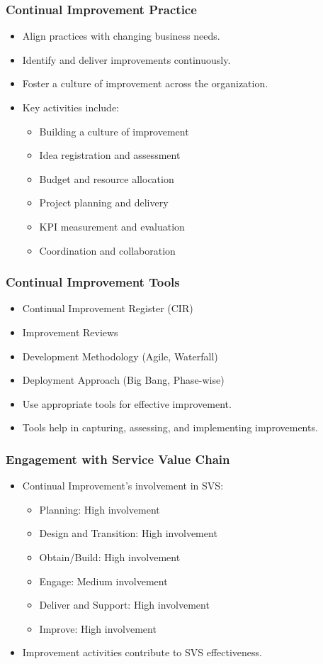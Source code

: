 \documentclass[aspectratio=169, table]{beamer}
\begin{document}
	\begin{frame}
		\frametitle{Continual Improvement Practice}
		\begin{itemize}
			\item Align practices with changing business needs.
			\item Identify and deliver improvements continuously.
			\item Foster a culture of improvement across the organization.
			\item Key activities include:
			\begin{itemize}
				\item Building a culture of improvement
				\item Idea registration and assessment
				\item Budget and resource allocation
				\item Project planning and delivery
				\item KPI measurement and evaluation
				\item Coordination and collaboration
			\end{itemize}
		\end{itemize}
	\end{frame}
	
	\begin{frame}
		\frametitle{Continual Improvement Tools}
		\begin{itemize}
			\item Continual Improvement Register (CIR)
			\item Improvement Reviews
			\item Development Methodology (Agile, Waterfall)
			\item Deployment Approach (Big Bang, Phase-wise)
			\item Use appropriate tools for effective improvement.
			\item Tools help in capturing, assessing, and implementing improvements.
		\end{itemize}
	\end{frame}
	
	\begin{frame}
		\frametitle{Engagement with Service Value Chain}
		\begin{itemize}
			\item Continual Improvement’s involvement in SVS:
			\begin{itemize}
				\item Planning: High involvement
				\item Design and Transition: High involvement
				\item Obtain/Build: High involvement
				\item Engage: Medium involvement
				\item Deliver and Support: High involvement
				\item Improve: High involvement
			\end{itemize}
			\item Improvement activities contribute to SVS effectiveness.
		\end{itemize}
	\end{frame}
	
\end{document}
